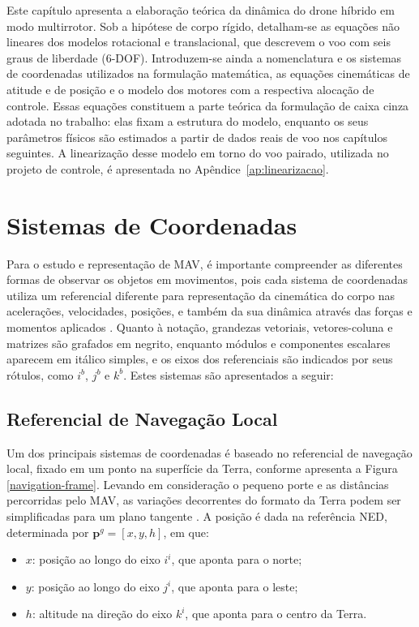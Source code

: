 Este capítulo apresenta a elaboração teórica da dinâmica do drone híbrido em modo multirrotor. Sob a hipótese de corpo rígido, detalham-se as equações não lineares dos modelos rotacional e translacional, que descrevem o voo com seis graus de liberdade (6-DOF). Introduzem-se ainda a nomenclatura e os sistemas de coordenadas utilizados na formulação matemática, as equações cinemáticas de atitude e de posição e o modelo dos motores com a respectiva alocação de controle. Essas equações constituem a parte teórica da formulação de caixa cinza adotada no trabalho: elas fixam a estrutura do modelo, enquanto os seus parâmetros físicos são estimados a partir de dados reais de voo nos capítulos seguintes. A linearização desse modelo em torno do voo pairado, utilizada no projeto de controle, é apresentada no Apêndice~\ref{ap:linearizacao}.


\section{Sistemas de Coordenadas}

Para o estudo e representação de \gls{MAV}, é importante compreender as diferentes formas de observar os objetos em movimentos, pois cada sistema de coordenadas utiliza um referencial diferente para representação da cinemática do corpo nas acelerações, velocidades, posições, e também da sua dinâmica através das forças e momentos aplicados \cite{Farrell2008}. Quanto à notação, grandezas vetoriais, vetores-coluna e matrizes são grafados em negrito, enquanto módulos e componentes escalares aparecem em itálico simples, e os eixos dos referenciais são indicados por seus rótulos, como $i^b$, $j^b$ e $k^b$. Estes sistemas são apresentados a seguir:

\subsection{Referencial de Navegação Local}

Um dos principais sistemas de coordenadas é baseado no referencial de navegação local, fixado em um ponto na superfície da Terra, conforme apresenta a Figura \ref{navigation-frame}. Levando em consideração o pequeno porte e as distâncias percorridas pelo MAV, as variações decorrentes do formato da Terra podem ser simplificadas para um plano tangente \cite{Farrell2008}. A posição é dada na referência \gls{NED}, determinada por $\mathbf{p}^{g}=[x,y,h]$, em que:

\begin{itemize}
    \item $x$: posição ao longo do eixo $i^i$, que aponta para o norte;
    \item $y$: posição ao longo do eixo $j^i$, que aponta para o leste;
    \item $h$: altitude na direção do eixo $k^i$, que aponta para o centro da Terra.
\end{itemize}

